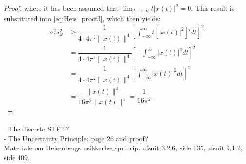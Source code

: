 \begin{proof}
where it has been assumed that $\lim_{|t| \to \infty} t |x(t)|^2 = 0$. This result is substituted into \eqref{eq:Heis_proof3}, which then yields:
\begin{align*}
\sigma_t^2 \sigma_\omega^2 &\geq \dfrac{1}{4 \cdot 4\pi^2 \|x(t)\|^4} \left[ \int_{-\infty}^\infty t \left[ |x(t)|^2 \right]' dt \right]^2 \\
&= \dfrac{1}{4 \cdot 4\pi^2 \|x(t)\|^4} \left[ - \int_{-\infty}^\infty |x(t)|^2 dt \right]^2 \\
&= \dfrac{1}{4 \cdot 4\pi^2 \|x(t)\|^4} \left[ \int_{-\infty}^\infty |x(t)|^2 dt \right]^2 \\
&= \dfrac{\|x(t)\|^4}{16\pi^2 \|x(t)\|^4} = \dfrac{1}{16\pi^2}.
\end{align*}

\end{proof}

- The discrete STFT? \\
- The Uncertainty Principle: page 26 and proof? \\
Materiale om Heisenbergs usikkerhedsprincip: afsnit 3.2.6, side 135; afsnit 9.1.2, side 409.